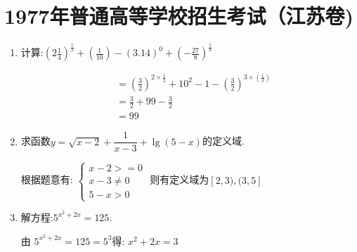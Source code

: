 \section*{1977年普通高等学校招生考试（江苏卷)}

\begin{questions}
	\question
	\begin{enumerate}[label=(\arabic*)]
		\item 计算:$ \left(2\frac14\right)^\frac12 + \left(\frac{1}{10}\right) - (3.14)^0 +
			      \left(-\frac{27}{8}\right)^{\frac13} $
		      \begin{solution}
			      \begin{align*}
				       & = \left(\frac32\right)^{2\times\frac12} + 10^2 - 1 - \left(\frac32\right)^{3\times(\frac13)} \\
				       & = \frac32 + 99 - \frac32                                                                     \\
				       & = 99
			      \end{align*}
		      \end{solution}

		\item 求函数$y=\sqrt{x-2} + \dfrac{1}{x-3} + \lg(5-x)$的定义域.
		      \begin{solution}
			      根据题意有:
			      \begin{math}
				      \begin{cases}
					      x - 2 >= 0   \\
					      x - 3 \neq 0 \\
					      5 - x > 0
				      \end{cases}
			      \end{math}
			      则有定义域为$[2,3),(3,5]$

		      \end{solution}
		\item 解方程:$ 5^{x^2+2x} = 125 $.
		      \begin{solution}
			      由 $5^{x^2 + 2x} = 125 = 5^3 $得: $x^2 + 2x = 3$


\end{solution}
\end{enumerate}
\end{questions}
